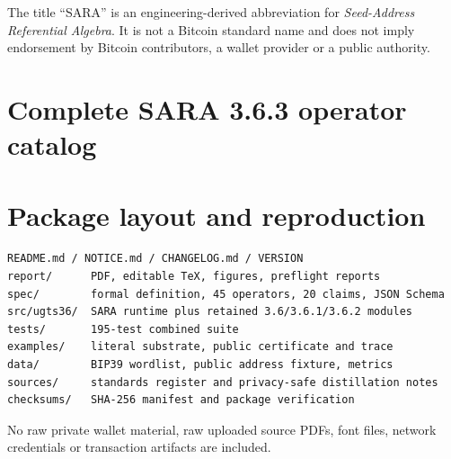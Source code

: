 \documentclass[10pt,a4paper]{article}
\begin{document}
The title ``SARA'' is an engineering-derived abbreviation for \emph{Seed-Address Referential Algebra}. It is not a Bitcoin standard name and does not imply endorsement by Bitcoin contributors, a wallet provider or a public authority.

\section{Complete SARA 3.6.3 operator catalog}
\begin{landscape}
\scriptsize

\end{landscape}

\section{Package layout and reproduction}

\begin{Verbatim}[breaklines=true,fontsize=\small]
README.md / NOTICE.md / CHANGELOG.md / VERSION
report/      PDF, editable TeX, figures, preflight reports
spec/        formal definition, 45 operators, 20 claims, JSON Schema
src/ugts36/  SARA runtime plus retained 3.6/3.6.1/3.6.2 modules
tests/       195-test combined suite
examples/    literal substrate, public certificate and trace
data/        BIP39 wordlist, public address fixture, metrics
sources/     standards register and privacy-safe distillation notes
checksums/   SHA-256 manifest and package verification
\end{Verbatim}

No raw private wallet material, raw uploaded source PDFs, font files, network credentials or transaction artifacts are included.
\end{document}
